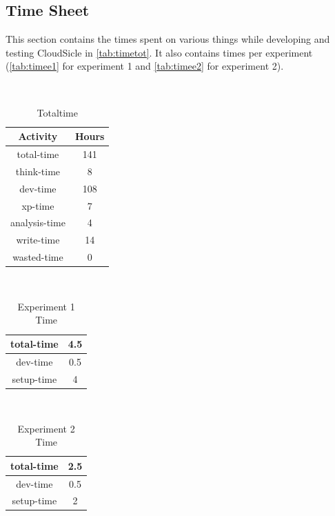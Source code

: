 \documentclass[twocolumn,twoside]{IEEEtran}
\begin{document}
\begin{appendices}
\section{Time Sheet}
This section contains the times spent on various things while developing
and testing CloudSicle in \autoref{tab:timetot}. It also contains times per experiment 
(\autoref{tab:timee1} for experiment 1 and \autoref{tab:timee2} for experiment 2).
\begin{table}[htb]
\caption{Totaltime}
\label{tab:timetot}
\begin{center}
{\tt
\begin{tabular}{|c|c|}
\hline
Activity&Hours\\\hline\hline
total-time&141\\\hline
think-time&8\\\hline
dev-time&108\\\hline
xp-time&7\\\hline
analysis-time&4\\\hline
write-time&14\\\hline
wasted-time&0\\\hline
\end{tabular}
} 
\end{center}
\end{table}
\begin{table}[htb]
\caption{Experiment 1 Time}
\label{tab:timee1}
\begin{center}
{\tt
\begin{tabular}{|c|c|}
\hline
total-time&4.5\\\hline
dev-time&0.5\\\hline
setup-time&4\\\hline
\end{tabular}
} 
\end{center}
\end{table}
\begin{table}[htb]
\caption{Experiment 2 Time}
\label{tab:timee2}
\begin{center}
{\tt
\begin{tabular}{|c|c|}
\hline
total-time&2.5\\\hline
dev-time&0.5\\\hline
setup-time&2\\\hline
\end{tabular}
} 
\end{center}
\end{table}

\end{appendices}
\end{document}
